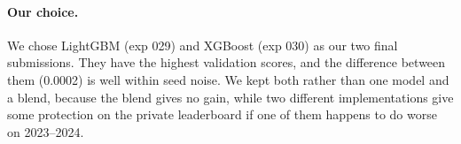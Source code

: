 \paragraph{Our choice.} We chose LightGBM (exp 029) and XGBoost (exp 030) as our two final submissions. They have the highest validation scores, and the difference between them (0.0002) is well within seed noise. We kept both rather than one model and a blend, because the blend gives no gain, while two different implementations give some protection on the private leaderboard if one of them happens to do worse on 2023--2024.
